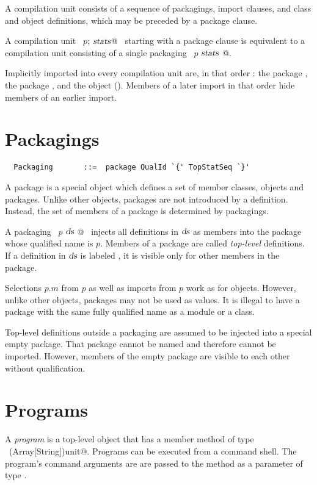 A compilation unit consists of a sequence of packagings, import
clauses, and class and object definitions, which may be preceded by a
package clause.

A compilation unit ~\lstinline@package $p$; $\mbox{\sl stats}$@~ starting with a package
clause is equivalent to a compilation unit consisting of a single
packaging ~\lstinline@package $p$ { $\mbox{\sl stats}$ }@.

Implicitly imported into every compilation unit are, in that order :
the package , the package , and the object
 (). Members of a later import in
that order hide members of an earlier import.

\section{Packagings}\label{sec:packagings}

\syntax\begin{lstlisting}
  Packaging       ::=  package QualId `{' TopStatSeq `}'
\end{lstlisting}

A package is a special object which defines a set of member classes,
objects and packages.  Unlike other objects, packages are not introduced
by a definition.  Instead, the set of members of a package is determined by
packagings.

A packaging ~\lstinline@package $p$ { $\mbox{\sl ds}$ }@~ injects all
definitions in $\mbox{\sl ds}$ as members into the package whose qualified name
is $p$. Members of a package are called {\em top-level} definitions.
If a definition in $\mbox{\sl ds}$ is labeled , it is
visible only for other members in the package.

Selections $p$.$m$ from $p$ as well as imports from $p$
work as for objects. However, unlike other objects, packages may not
be used as values. It is illegal to have a package with the same fully
qualified name as a module or a class.

Top-level definitions outside a packaging are assumed to be injected
into a special empty package. That package cannot be named and
therefore cannot be imported. However, members of the empty package
are visible to each other without qualification.

\section{Programs}

A {\em program} is a top-level object that has a member method
 of type ~\lstinline@(Array[String])unit@. Programs can be
executed from a command shell. The program's command arguments are are
passed to the  method as a parameter of type
.

